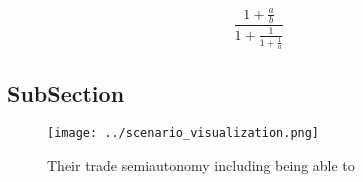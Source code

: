 \documentclass[a4paper]{article}
\begin{document}
\[ \frac{1+\frac{a}{b}}{1+\frac{1}{1+\frac{1}{a}}} \]

\subsection{SubSection}

\begin{figure}
\centering
\texttt{[image: ../scenario\_visualization.png]}
\caption{Their trade semiautonomy including being able to 
}
\end{figure}
 
\end{document}
